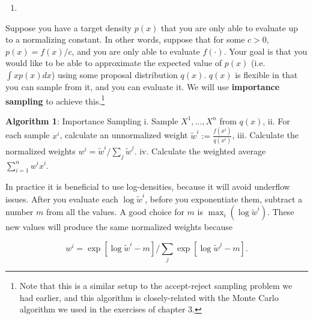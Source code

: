 \documentclass[
  12pt,
  krantz2]{krantz}
\providecommand{\tightlist}{%
  \setlength{\itemsep}{0pt}\setlength{\parskip}{0pt}}
\begin{document}
\begin{enumerate}
\def\labelenumi{\arabic{enumi}.}
\setcounter{enumi}{9}
\tightlist
\item
\end{enumerate}

Suppose you have a target density \(p(x)\) that you are only able to evaluate up to a normalizing constant. In other words, suppose that for some \(c > 0\), \(p(x) = f(x) / c\), and you are only able to evaluate \(f(\cdot)\). Your goal is that you would like to be able to approximate the expected value of \(p(x)\) (i.e.~\(\int x p(x) dx\)) using some proposal distribution \(q(x)\). \(q(x)\) is flexible in that you can sample from it, and you can evaluate it. We will use \textbf{importance sampling} \citep{impsamping1} \citep{impsamping2} to achieve this.\footnote{Note that this is a similar setup to the accept-reject sampling problem we had earlier, and this algorithm is closely-related with the Monte Carlo algorithm we used in the exercises of chapter 3.}

\textbf{Algorithm 1}: Importance Sampling
i. Sample \(X^1, \ldots, X^n\) from \(q(x)\),
ii. For each sample \(x^i\), calculate an unnormalized weight \(\tilde{w}^i:= \frac{f(x^i)}{q(x^i)}\),
iii. Calculate the normalized weights \(w^i = \tilde{w}^i \bigg/ \sum_j \tilde{w}^j\).
iv. Calculate the weighted average \(\sum_{i=1}^n w^i x^i\).

In practice it is beneficial to use log-densities, because it will avoid underflow issues. After you evaluate each \(\log \tilde{w}^i\), before you exponentiate them, subtract a number \(m\) from all the values. A good choice for \(m\) is \(\max_i (\log \tilde{w}^i)\). These new values will produce the same normalized weights because

\begin{equation} 
w^i = \exp[ \log \tilde{w}^i - m] \bigg/ \sum_j \exp[\log \tilde{w}^j - m].
\end{equation}
\end{document}
